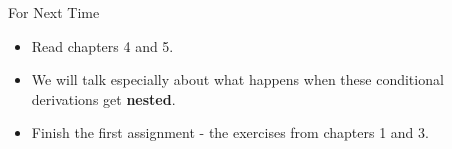 \documentclass[
  ignorenonframetext,
]{beamer}
\providecommand{\tightlist}{%
  \setlength{\itemsep}{0pt}\setlength{\parskip}{0pt}}
\renewcommand{\,}{\text{, }}
\begin{document}
\begin{frame}{For Next Time}
\protect\hypertarget{for-next-time}{}

\begin{itemize}
\tightlist
\item
  Read chapters 4 and 5.
\item
  We will talk especially about what happens when these conditional
  derivations get \textbf{nested}.
\item
  Finish the first assignment - the exercises from chapters 1 and 3.
\end{itemize}

\end{frame}
\end{document}
